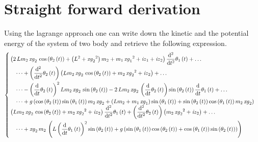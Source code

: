 \section{Straight forward derivation}
%
Using the lagrange approach one can write down the kinetic and the potential energy of the system of two body and retrieve the following expression.
%
\footnotesize
\begin{equation}
    \label{eq:lagrange}
\begin{cases}
    \begin{split}
& \left( 2\,Lm_{2}\,{\it xg}_{2}\,\cos\left( \theta_{2} \left( t \right)  \right) + \left( {L}^{2}+{{\it xg }_{2}}^{2} \right) m_{2}+m_{1}\,{{\it xg}_{1}}^{2}+{\it iz}_{1}+{\it iz}_{2} \right) {\frac {{\rm d}^{2}}{{\rm d}{t}^{2}}}\theta_{1}\left( t \right) + \dots \\
&\quad\dots + \left( {\frac {{\rm d}^{2}}{{\rm d}{t}^{2}}}\theta_{2} \left( t \right)  \right)  \left( Lm_{2}\,{\it xg}_{2}\,\cos\left( \theta_{2} \left( t \right)  \right) +m_{2}\,{{\it xg}_{2}}^{2}+{\it iz}_{2} \right) + \dots\\
&\quad\dots - \left( {\frac {\rm d}{{\rm d}t}}\theta_{2}\left( t \right)  \right) ^{2}Lm_{2}\,{\it xg}_{2}\,\sin \left( \theta_{2} \left( t \right)  \right) -2\,Lm_{2}\,{\it xg}_{2}\,\left( {\frac {\rm d}{{\rm d}t}}\theta_{2} \left( t \right)  \right) \sin \left( \theta_{2} \left( t \right)  \right) {\frac {\rm d}{{\rm d}t}}\theta_{1} \left( t \right) + \dots \\
&\quad \dots + g \left( \cos \left( \theta_{2}\left( t \right)  \right) \sin \left( \theta_{1} \left( t \right) \right) m_{2}\,{\it xg}_{2} + \left( Lm_{2}+m_{1}\,{\it xg}_{1}\right) \sin \left( \theta_{1} \left( t \right)  \right) + \sin\left( \theta_{2} \left( t \right)  \right) \cos \left( \theta_{1}\left( t \right)  \right) m_{2}\,{\it xg}_{2} \right) 
\end{split}\\
\begin{split}
&\left( Lm_{2}\,{\it xg}_{2}\,\cos \left( \theta_{2} \left( t \right)  \right) +m_{2}\,{{\it xg}_{2}}^{2}+{\it iz}_{2}\right) {\frac {{\rm d}^{2}}{{\rm d}{t}^{2}}}\theta_{1} \left( t\right) + \left( {\frac {{\rm d}^{2}}{{\rm d}{t}^{2}}}\theta_{2}\left( t \right)  \right)  \left( m_{2}\,{{\it xg}_{2}}^{2}+{\it iz}_{2} \right) + \dots \\
&\quad \dots + {\it xg}_{2}\,m_{2}\, \left( L \left( {\frac {\rm d}{{\rm d}t}}\theta_{1} \left( t \right)  \right) ^{2}\sin \left( \theta_{2} \left( t \right)  \right) +g \left( \sin \left( \theta_{1} \left( t \right)  \right) \cos \left( \theta_{2} \left( t \right)  \right) +\cos \left( \theta_{1} \left( t \right)  \right) \sin \left( \theta_{2} \left( t \right)  \right)  \right)  \right)  
\end{split}  
\end{cases} 
\end{equation}
\normalsize
%
